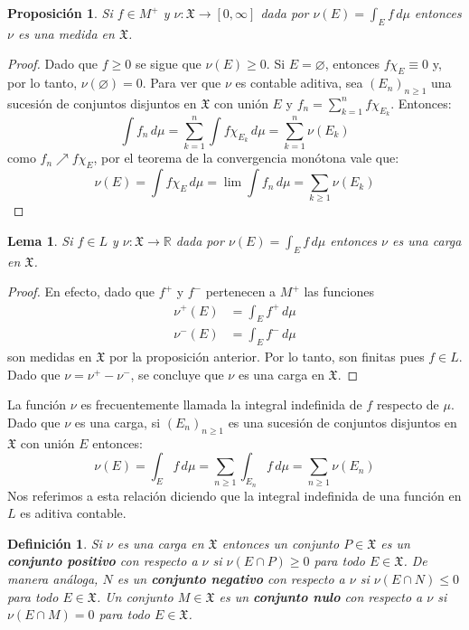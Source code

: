 \documentclass[12pt,a4paper]{article}
\theoremstyle{profesional}
\newtheorem{lemma}[teorema]{Lema}
\newtheorem{proposicion}[teorema]{Proposición}
\theoremstyle{definicion-style}
\newtheorem{definicion}[teorema]{Definición}
\newcommand{\R}{\mathbb{R}}
\newcommand{\X}{\mathfrak{X}}
\begin{document}
\begin{proposicion}
    Si \( f \in M^+ \) y \( \nu : \X \to [0, \infty] \) dada por \( \nu(E) = \int_E f \, d\mu \) entonces \( \nu \) es una medida en \( \X \).
\end{proposicion}
\begin{proof}
    Dado que \( f \geq 0 \) se sigue que \( \nu(E) \geq 0 \). Si \( E = \varnothing \), entonces \( f \chi_E \equiv 0 \) y, por lo tanto, \( \nu(\varnothing) = 0 \).
    Para ver que \( \nu \) es contable aditiva, sea \( {(E_n)}_{n \geq 1} \) una sucesión de conjuntos disjuntos en \( \X \) con unión \( E \) y \( f_n = \sum_{k = 1}^n f \chi_{E_k} \). Entonces:
    \[
        \int f_n \, d\mu = \sum_{k = 1}^n \int f \chi_{E_k} \, d \mu = \sum_{k = 1}^n \nu(E_k)
    \]
    como \( f_n \nearrow f \chi_E \), por el teorema de la convergencia monótona vale que: \[
        \nu(E) = \int f \chi_E \, d \mu = \lim \int f_n \, d \mu = \sum_{k \geq 1} \nu(E_k)
    \]
\end{proof}

\begin{lemma}
    Si \( f \in L \) y \( \nu : \X \to \R \) dada por \( \nu(E) = \int_E f \, d\mu \) entonces \( \nu \) es una carga en \( \X \).
\end{lemma}
\begin{proof}
    En efecto, dado que \( f^+ \) y \( f^- \) pertenecen a \( M^+ \) las funciones \begin{align*}
        \nu^+(E) & = \int_E f^+ \, d\mu \\
        \nu^-(E) & = \int_E f^- \, d\mu
    \end{align*}
    son medidas en \( \X \) por la proposición anterior. Por lo tanto, son finitas pues \( f \in L \). Dado que \( \nu = \nu^+ - \nu^- \), se concluye que \( \nu \) es una carga en \( \X \).
\end{proof}

La función \( \nu \) es frecuentemente llamada la integral indefinida de \( f \) respecto de \( \mu \). Dado que \( \nu \) es una carga, si
\( {(E_n)}_{n \geq 1} \) es una sucesión de conjuntos disjuntos en \( \X \) con unión \( E \) entonces: \[
    \nu(E) = \int_E f \, d\mu = \sum_{n \geq 1} \int_{E_n} f \, d\mu = \sum_{n \geq 1} \nu(E_n)
\]
Nos referimos a esta relación diciendo que la integral indefinida de una función en \( L \) es aditiva contable.

\begin{definicion}
    Si \( \nu \) es una carga en \( \X \) entonces un conjunto \( P \in \X \) es un \textbf{conjunto positivo} con respecto a \( \nu \)
    si \( \nu(E \cap P) \geq 0 \) para todo \( E \in \X \). De manera análoga, \( N \) es un \textbf{conjunto negativo} con respecto a \( \nu \) si
    \( \nu(E \cap N) \leq 0 \) para todo \( E \in \X \). Un conjunto \( M \in \X \) es un \textbf{conjunto nulo} con respecto a \( \nu \) si
    \( \nu(E \cap M) = 0 \) para todo \( E \in \X \).
\end{definicion}
\end{document}
